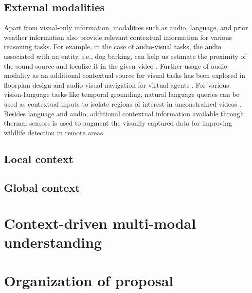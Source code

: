 \subsection{External modalities}
Apart from visual-only information, modalities such as audio, language, and prior weather information also provide relevant contextual information for various reasoning tasks. For example, in the case of audio-visual tasks, the audio associated with an entity, i.e., dog barking, can help us estimate the proximity of the sound source and localize it in the given video \cite{Tian2018AudioVisualEL}. Further usage of audio modality as an additional contextual source for visual tasks has been explored in floorplan design \cite{purushwalkam2020audio} and audio-visual navigation for virtual agents \cite{chen2020soundspaces}. For various vision-language tasks like temporal grounding, natural language queries can be used as contextual inputs to isolate regions of interest in unconstrained videos \cite{Zhang2022TemporalSG}. Besides language and audio, additional contextual information available through thermal sensors \cite{Seymour2017AutomatedDA} is used to augment the visually captured data for improving wildlife detection in remote areas.

\subsection{Local context}

\subsection{Global context}

\section{Context-driven multi-modal understanding}
\section{Organization of proposal}

